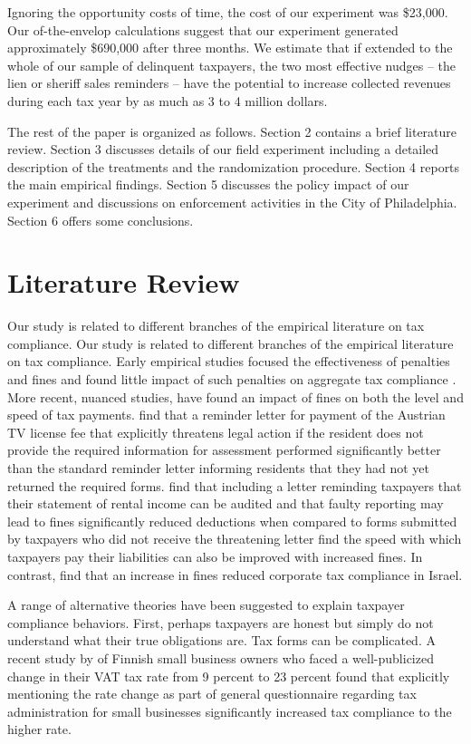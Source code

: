 \documentclass[12pt]{article}
\begin{document}
Ignoring the opportunity costs of time, the cost of our experiment was
\$23,000.  Our of-the-envelop calculations suggest that our experiment
generated approximately \$690,000 after three months. We estimate that
if extended to the whole of our sample of delinquent taxpayers, the
two most effective nudges -- the lien or sheriff sales reminders --
have the potential to increase collected revenues during each tax year
by as much as 3 to 4 million dollars.

The rest of the paper is organized as follows. Section 2 contains a
brief literature review. Section 3 discusses details of our field
experiment including a detailed description of the treatments and the
randomization procedure. Section 4 reports the main empirical
findings. Section 5 discusses the policy impact of our experiment and
discussions on enforcement activities in the City of
Philadelphia. Section 6 offers some conclusions.
    

\section{Literature Review}

Our study is related to different branches of the empirical literature
on tax compliance. Our study is related to different branches of the
empirical literature on tax compliance. Early empirical studies
focused the effectiveness of penalties and fines and found little
impact of such penalties on aggregate tax compliance
\cite{Slemrod-07}.  More recent, nuanced studies, have found an impact
of fines on both the level and speed of tax payments.
 find that a reminder letter for payment of the
Austrian TV license fee that explicitly threatens legal action if the
resident does not provide the required information for assessment
performed significantly better than the standard reminder letter
informing residents that they had not yet returned the required forms.
 find that including a letter reminding
taxpayers that their statement of rental income can be audited and
that faulty reporting may lead to fines significantly reduced
deductions when compared to forms submitted by taxpayers who did not
receive the threatening letter  find the speed
with which taxpayers pay their liabilities can also be improved with
increased fines.  In contrast, \cite{Ariel-12} find that an increase
in fines reduced corporate tax compliance in Israel.

A range of alternative theories have been suggested to explain
taxpayer compliance behaviors.  First, perhaps taxpayers are honest
but simply do not understand what their true obligations are. Tax
forms can be complicated.  A recent study by  of
Finnish small business owners who faced a well-publicized change in
their VAT tax rate from 9 percent to 23 percent found that explicitly
mentioning the rate change as part of general questionnaire regarding
tax administration for small businesses significantly increased tax
compliance to the higher rate.
\end{document}
